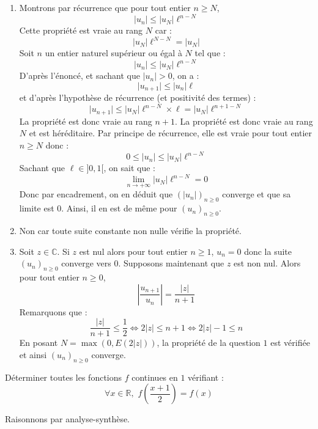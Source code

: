 \documentclass[a4paper,10pt]{report}
\begin{document}
\begin{enumerate}
\item Montrons par récurrence que pour tout entier $n \geq N$,
$$ \vert u_n \vert  \leq \vert u_N \vert  \ell^{n-N}$$
Cette propriété est vraie au rang $N$ car :
$$ \vert u_N \vert \ell^{N-N} = \vert u_N \vert $$
Soit $n$ un entier naturel supérieur ou égal à $N$ tel que :
$$  \vert u_n \vert \leq \vert u_N \vert \ell^{n-N}$$
D'après l'énoncé, et sachant que $\vert u_n \vert >0$, on a :
$$ \vert u_{n+1} \vert \leq \vert u_n \vert \ell$$
et d'après l'hypothèse de récurrence (et positivité des termes) : 
$$  \vert u_{n+1} \vert \leq \vert u_N \vert \ell^{n-N} \times \ell = \vert u_N \vert \ell^{n+1-N}$$
La propriété est donc vraie au rang $n+1$. La propriété est donc vraie au rang $N$ et est héréditaire. Par principe de récurrence, elle est vraie pour tout entier $n \geq N$ donc :
$$ 0 \leq \vert u_n \vert \leq  \vert u_N \vert  \ell^{n-N}$$
Sachant que $\ell \in ]0,1[$, on sait que :
$$ \lim_{n \rightarrow + \infty} \vert u_N \vert  \ell^{n-N} = 0$$
Donc par encadrement, on en déduit que $(\vert u_n \vert)_{n \geq 0}$ converge et que sa limite est $0$. Ainsi, il en est de même pour $(u_n)_{n \geq 0}$.
\item Non car toute suite constante non nulle vérifie la propriété.
\item Soit $z \in \mathbb{C}$. Si $z$ est nul alors pour tout entier $n \geq 1$, $u_n=0$ donc la suite $(u_n)_{n \geq 0}$ converge vers $0$. Supposons maintenant que $z$ est non nul. Alors pour tout entier $n \geq 0$,
$$ \left\vert \dfrac{u_{n+1}}{u_n} \right\vert =\dfrac{\vert z \vert}{n+1}$$
Remarquons que :
$$ \dfrac{\vert z \vert}{n+1} \leq \dfrac{1}{2} \Longleftrightarrow  2 \vert z \vert \leq n+1 \Longleftrightarrow 2 \vert z \vert - 1 \leq n$$
En posant $N = \max(0, E(2 \vert z\vert))$, la propriété de la question $1$ est vérifiée et ainsi $(u_n)_{n \geq 0}$ converge.
\end{enumerate}

\medskip

\begin{Exa}[\ding{80}] Déterminer toutes les fonctions $f$ continues en $1$ vérifiant :
$$ \forall x \in \mathbb{R}, \, \, f \left( \frac{x+1}{2} \right) =f(x)$$
\end{Exa}

\corr Raisonnons par analyse-synthèse.

\medskip
\end{document}
